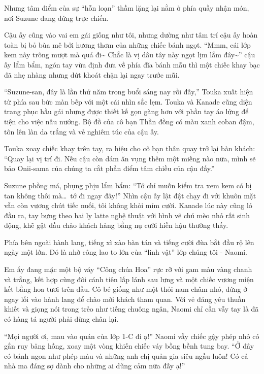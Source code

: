 \documentclass[../main.tex]{subfiles}
\begin{document}
Nhưng tâm điểm của sự ``hỗn loạn'' thầm lặng lại nằm ở phía quầy nhận món, nơi Suzune đang đứng trực chiến.

Cậu ấy cũng vào vai em gái giống như tôi, nhưng dường như tâm trí cậu ấy hoàn toàn bị bỏ bùa mê bởi hương thơm của những chiếc bánh ngọt. ``Mmm, cái lớp kem này trông mượt mà quá đi\~{} Chắc là vị dâu tây này ngọt lịm lắm đây\~{}'' cậu ấy lẩm bẩm, ngón tay vừa định đưa về phía đĩa bánh mẫu thì một chiếc khay bạc đã nhẹ nhàng nhưng dứt khoát chặn lại ngay trước mũi.

``Suzune-san, đây là lần thứ năm trong buổi sáng nay rồi đấy,'' Touka xuất hiện từ phía sau bức màn bếp với một cái nhìn sắc lẹm. Touka và Kanade cũng diện trang phục hầu gái nhưng được thiết kế gọn gàng hơn với phần tay áo lửng để tiện cho việc nấu nướng. Bộ đồ của cô bạn Thần đồng có màu xanh coban đậm, tôn lên làn da trắng và vẻ nghiêm túc của cậu ấy.

Touka xoay chiếc khay trên tay, ra hiệu cho cô bạn thân quay trở lại bàn khách: ``Quay lại vị trí đi. Nếu cậu còn dám ăn vụng thêm một miếng nào nữa, mình sẽ bảo Onii-sama của chúng ta cắt phần điểm tâm chiều của cậu đấy.''

Suzune phồng má, phụng phịu lẩm bẩm: ``Tớ chỉ muốn kiểm tra xem kem có bị tan không thôi mà\dots\ tớ đi ngay đây!'' Nhìn cậu ấy lật đật chạy đi với khuôn mặt vẫn còn vương chút tiếc nuối, tôi không khỏi mỉm cười. Kanade lúc này cũng ló đầu ra, tay bưng theo hai ly latte nghệ thuật với hình vẽ chú mèo nhỏ rất sinh động, khẽ gật đầu chào khách hàng bằng nụ cười hiền hậu thường thấy.

Phía bên ngoài hành lang, tiếng xì xào bàn tán và tiếng cười đùa bắt đầu rộ lên ngày một lớn. Đó là nhờ công lao to lớn của ``linh vật'' lớp chúng tôi - Naomi.

Em ấy đang mặc một bộ váy ``Công chúa Hoa'' rực rỡ với gam màu vàng chanh và trắng, kết hợp cùng đôi cánh tiên lấp lánh sau lưng và một chiếc vương miện kết bằng hoa tươi trên đầu. Cô bé giống như một thỏi nam châm nhỏ, đứng ở ngay lối vào hành lang để chào mời khách tham quan. Với vẻ đáng yêu thuần khiết và giọng nói trong trẻo như tiếng chuông ngân, Naomi chỉ cần vẫy tay là đã có hàng tá người phải dừng chân lại.

``Mọi người ơi, mau vào quán của lớp 1-C đi ạ!'' Naomi vẫy chiếc gậy phép nhỏ có gắn ruy băng hồng, xoay một vòng khiến chiếc váy bồng bềnh tung bay. ``Ở đây có bánh ngon như phép màu và những anh chị quản gia siêu ngầu luôn! Có cả nhà ma đáng sợ dành cho những ai dũng cảm nữa đấy ạ!''
\end{document}
